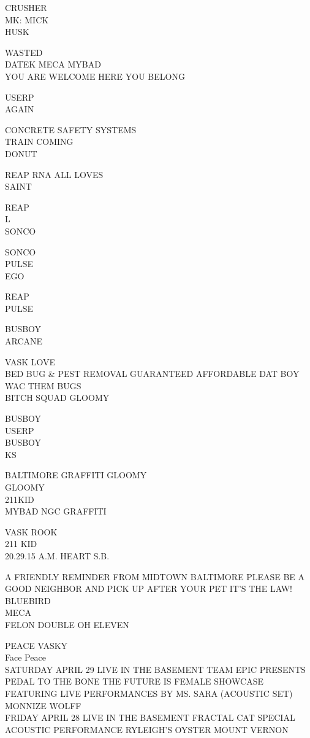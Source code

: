 \documentclass[10pt,letterpaper]{article}
\begin{document}
CRUSHER\\
MK: MICK\\
HUSK

WASTED\\
DATEK MECA MYBAD\\
YOU ARE WELCOME HERE YOU BELONG

USERP\\
AGAIN

CONCRETE SAFETY SYSTEMS\\
TRAIN COMING\\
DONUT

REAP RNA ALL LOVES\\
SAINT

REAP\\
L\\
SONCO

SONCO\\
PULSE\\
EGO

REAP\\
PULSE

BUSBOY\\
ARCANE

VASK LOVE\\
BED BUG \& PEST REMOVAL GUARANTEED AFFORDABLE DAT BOY WAC THEM BUGS\\
BITCH SQUAD GLOOMY

BUSBOY\\
USERP\\
BUSBOY\\
KS

BALTIMORE GRAFFITI GLOOMY\\
GLOOMY\\
211KID\\
MYBAD NGC GRAFFITI

VASK ROOK\\
211 KID\\
20.29.15 A.M. HEART S.B.

A FRIENDLY REMINDER FROM MIDTOWN BALTIMORE PLEASE BE A GOOD NEIGHBOR AND PICK UP AFTER YOUR PET IT'S THE LAW!\\
BLUEBIRD\\
MECA\\
FELON DOUBLE OH ELEVEN

PEACE VASKY\\
Face Peace\\
SATURDAY APRIL 29 LIVE IN THE BASEMENT TEAM EPIC PRESENTS PEDAL TO THE BONE THE FUTURE IS FEMALE SHOWCASE FEATURING LIVE PERFORMANCES BY MS. SARA (ACOUSTIC SET)  MONNIZE WOLFF\\
FRIDAY APRIL 28 LIVE IN THE BASEMENT FRACTAL CAT SPECIAL ACOUSTIC PERFORMANCE RYLEIGH'S OYSTER MOUNT VERNON
\end{document}
